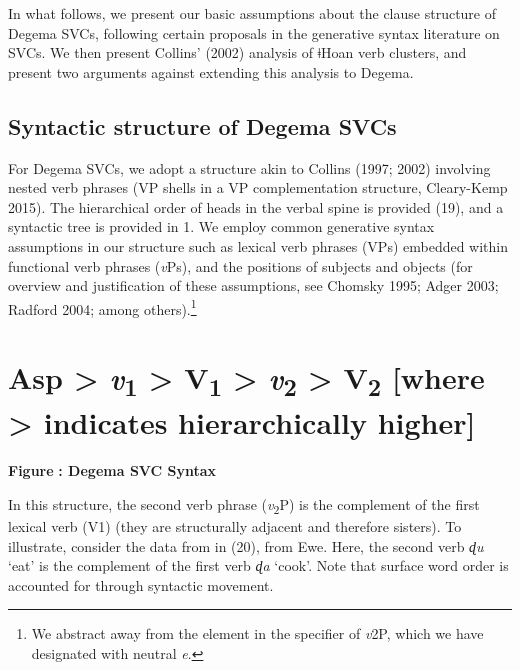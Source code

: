 In what follows, we present our basic assumptions about the clause structure of Degema SVCs, following certain proposals in the generative syntax literature on SVCs. We then present Collins’ (2002) analysis of ǂHoan verb clusters, and present two arguments against extending this analysis to Degema. 

\section{Syntactic structure of Degema SVCs}
\label{bkm:Ref449512725}
For Degema SVCs, we adopt a structure akin to Collins (1997; 2002) involving nested verb phrases (VP shells in a VP complementation structure, Cleary-Kemp 2015). The hierarchical order of heads in the verbal spine is provided (19), and a syntactic tree is provided in 1. We employ common generative syntax assumptions in our structure such as lexical verb phrases (VPs) embedded within functional verb phrases (\textit{v}Ps), and the positions of subjects and objects (for overview and justification of these assumptions, see Chomsky 1995; Adger 2003; Radford 2004; among others).\footnote{We abstract away from the element in the specifier of \textit{v}2P, which we have designated with neutral \textit{e}.
}

\chapter[Asp {\textgreater} v1 {\textgreater} V1 {\textgreater} v2 {\textgreater} V2   [where {\textgreater} indicates hierarchically higher{]}]{Asp {\textgreater} \textit{v}\textsubscript{1} {\textgreater} V\textsubscript{1} {\textgreater} \textit{v}\textsubscript{2} {\textgreater} V\textsubscript{2}\textsubscript{   }[where {\textgreater} indicates hierarchically higher]}
\label{bkm:Ref449436541}\begin{styleNoSpacing}
  
 
\end{styleNoSpacing}

\begin{styleNoSpacing}
\label{bkm:Ref449547295}\textbf{Figure }\textbf{: Degema SVC Syntax}
\end{styleNoSpacing}

In this structure, the second verb phrase (\textit{v}\textsubscript{2}P) is the complement of the first lexical verb (V1) (they are structurally adjacent and therefore sisters). To illustrate, consider the data from \citet{Collins1997} in (20), from Ewe. Here, the second verb \textit{ɖu }‘eat’ is the complement of the first verb\textit{ ɖa }‘cook’. Note that surface word order is accounted for through syntactic movement.

